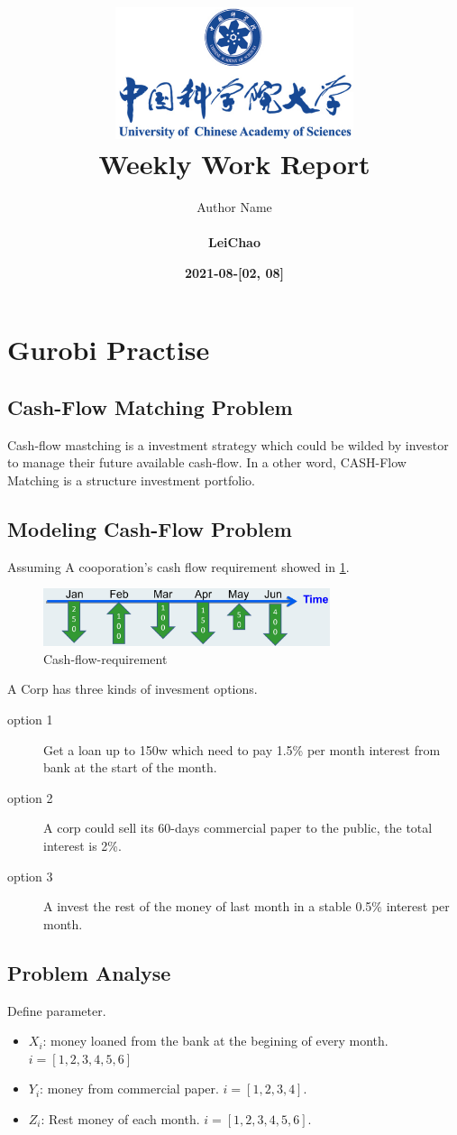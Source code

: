 \documentclass[a4paper]{article}
\title{
    \vspace*{1in}
    \includegraphics[width=2.75in]{figures/UCAS-LOGO.png} \\
    \vspace*{1.2in}
    \textbf{\huge Weekly Work Report}
    \vspace{0.2in}
}
\author{Author Name \\
    \vspace*{0.5in} \\
    \textbf{LeiChao} \\
    \vspace*{1in}
}
\date{\textbf{2021-08-[02, 08]}}
\begin{document}
\maketitle
\setcounter{page}{0}
\thispagestyle{empty}
\newpage


\section{Gurobi Practise}

\subsection{Cash-Flow Matching Problem}
Cash-flow mastching is a investment strategy which could be wilded by investor to manage their future available cash-flow. In a other word, CASH-Flow Matching is a structure investment portfolio.

\subsection{Modeling Cash-Flow Problem}
Assuming A cooporation's cash flow requirement showed in \ref{fig:cash-flow-requirement}.

\begin{figure}[h]
    \centering
    \includegraphics[width=0.75\textwidth]{figures/cash-flow-requirement.png}
    \caption{Cash-flow-requirement}
    \label{fig:cash-flow-requirement}
\end{figure}

A Corp has three kinds of invesment options.

\begin{description}
    \item[option 1] Get a loan up to 150w which need to pay 1.5\% per month interest from bank at the start of the month.
    \item[option 2] A corp could sell its 60-days commercial paper to the public, the total interest is 2\%.
    \item[option 3] A invest the rest of the money of last month in a stable 0.5\% interest per month.
\end{description}

\subsection{Problem Analyse}
Define parameter.
\begin{itemize}
    \item $X_i$: money loaned from the bank at the begining of every month.$i=[1, 2, 3, 4, 5, 6]$
    \item $Y_i$: money from commercial paper. $i=[1, 2, 3, 4]$.
    \item $Z_i$: Rest money of each month. $i=[1, 2, 3, 4, 5, 6]$.
\end{itemize}
\end{document}
